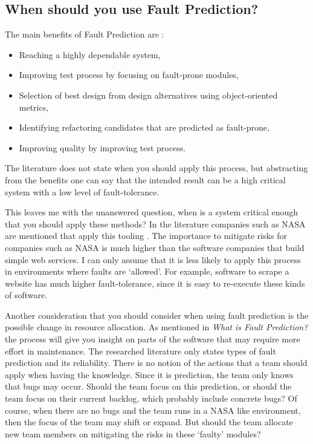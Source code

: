 \subsection*{When should you use Fault Prediction?}

The main benefits of Fault Prediction are \autocite[4626]{Catal20114626}:

\begin{itemize}
\setlength\itemsep{0em}
\item Reaching a highly dependable system,
\item Improving test process by focusing on fault-prone modules,
\item Selection of best design from design alternatives using object-oriented metrics,
\item Identifying refactoring candidates that are predicted as fault-prone,
\item Improving quality by improving test process.
\end{itemize}

The literature does not state when you should apply this process,
but abstracting from the benefits one can say that the intended result can be a high critical system with a low level of fault-tolerance.

This leaves me with the unanswered question, when is a system critical enough that you should apply these methods?
In the literature companies such as NASA are mentioned that apply this tooling \autocite[4626]{Catal20114626} \autocite[7347]{Catal20097346}.
The importance to mitigate risks for companies such as NASA is much higher than the software companies that build simple web services.
I can only assume that it is less likely to apply this process in environments where faults are `allowed'.
For example, software to scrape a website has much higher fault-tolerance, since it is easy to re-execute these kinds of software.

Another consideration that you should consider when using fault prediction is the possible change in resource allocation.
As mentioned in \textit{What is Fault Prediction?} the process will give you insight on parts of the software that may require more effort in maintenance.
The researched literature only states types of fault prediction and its reliability.
There is no notion of the actions that a team should apply when having the knowledge. Since it is prediction, the team only knows that bugs may occur.
Should the team focus on this prediction, or should the team focus on their current backlog, which probably include concrete bugs?
Of course, when there are no bugs and the team runs in a NASA like environment, then the focus of the team may shift or expand.
But should the team allocate new team members on mitigating the risks in these `faulty' modules?

